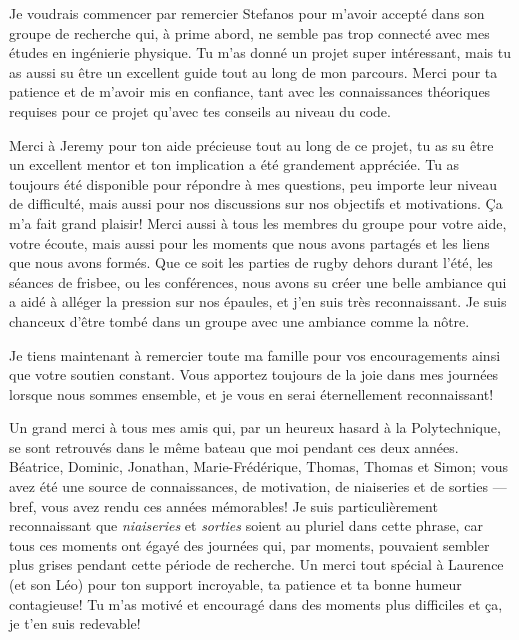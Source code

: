 \begin{comment}
\end{comment}


Je voudrais commencer par remercier Stefanos pour m'avoir accepté dans son groupe de recherche qui, à prime abord, ne semble pas trop connecté avec mes études en ingénierie physique.
Tu m'as donné un projet super intéressant, mais tu as aussi su être un excellent guide tout au long de mon parcours.
Merci pour ta patience et de m'avoir mis en confiance, tant avec les connaissances théoriques requises pour ce projet qu'avec tes conseils au niveau du code.

Merci à Jeremy pour ton aide précieuse tout au long de ce projet, tu as su être un excellent mentor et ton implication a été grandement appréciée.
Tu as toujours été disponible pour répondre à mes questions, peu importe leur niveau de difficulté, mais aussi pour nos discussions sur nos objectifs et motivations.
Ça m'a fait grand plaisir!
Merci aussi à tous les membres du groupe pour votre aide, votre écoute, mais aussi pour les moments que nous avons partagés et les liens que nous avons formés.
Que ce soit les parties de rugby dehors durant l'été, les séances de frisbee, ou les conférences, nous avons su créer une belle ambiance qui a aidé à alléger la pression sur nos épaules, et j'en suis très reconnaissant.
Je suis chanceux d'être tombé dans un groupe avec une ambiance comme la nôtre.

Je tiens maintenant à remercier toute ma famille pour vos encouragements ainsi que votre soutien constant.
Vous apportez toujours de la joie dans mes journées lorsque nous sommes ensemble, et je vous en serai éternellement reconnaissant!

Un grand merci à tous mes amis qui, par un heureux hasard à la Polytechnique, se sont retrouvés dans le même bateau que moi pendant ces deux années.
Béatrice, Dominic, Jonathan, Marie-Frédérique, Thomas, Thomas et Simon; vous avez été une source de connaissances, de motivation, de niaiseries et de sorties — bref, vous avez rendu ces années mémorables!
Je suis particulièrement reconnaissant que \textit{niaiseries} et \textit{sorties} soient au pluriel dans cette phrase, car tous ces moments ont égayé des journées qui, par moments, pouvaient sembler plus grises pendant cette période de recherche.
Un merci tout spécial à Laurence (et son Léo) pour ton support incroyable, ta patience et ta bonne humeur contagieuse!
Tu m'as motivé et encouragé dans des moments plus difficiles et ça, je t'en suis redevable!

